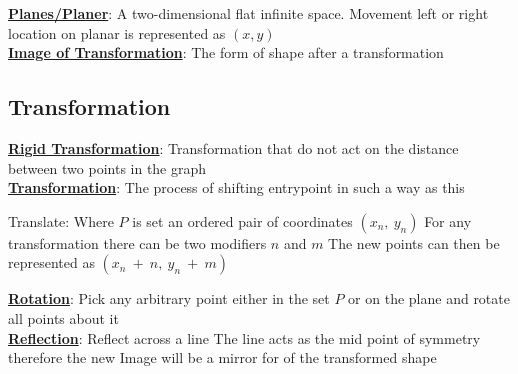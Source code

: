 \documentclass[12pt]{article}
\newcommand{\defline}[2]{\noindent\textbf{\underline{#1}}: #2\\}
\begin{document}
            \defline{Planes/Planer}{A two-dimensional flat infinite space. Movement left or right location on planar is represented as $(x, y)$}

            \defline{Image of Transformation}{The form of shape after a transformation}

        \subsection{Transformation}

            \defline{Rigid Transformation}{Transformation that do not act on the distance between two points in the graph}

            \defline{Transformation}{The process of shifting entrypoint in such a way as this}
            \begin{outline}
                \1 Translate:
                \1 Where $P$ is set an ordered pair of coordinates $(x_n,\ y_n)$
                \1 For any transformation there can be two modifiers $n$ and $m$
                \1 The new points can then be represented as $(x_n\ +\ n,\ y_n\ +\ m)$
            \end{outline}

            \defline{Rotation}{Pick any arbitrary point either in the set $P$ or on the plane and rotate all points about it}

            \defline{Reflection} {Reflect across a line The line acts as the mid point of symmetry therefore the new Image will be a mirror for of the transformed shape}
    \section{}
\end{document}
